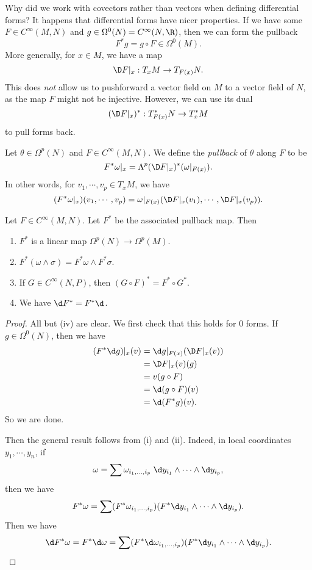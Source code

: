 \documentclass[a4paper]{article}
\begin{document}
Why did we work with covectors rather than vectors when defining differential forms? It happens that differential forms have nicer properties. If we have some $F \in C^\infty(M, N)$ and $g \in \Omega^0(N) = C^{\infty}(N, \R)$, then we can form the pullback
\[
  F^*g = g \circ F \in \Omega^0(M).
\]
More generally, for $x \in M$, we have a map
\[
  \D F|_x : T_x M \to T_{F(x)}N.
\]
This does \emph{not} allow us to pushforward a vector field on $M$ to a vector field of $N$, as the map $F$ might not be injective. However, we can use its dual
\[
  (\D F|_x)^*: T_{F(x)}^* N \to T_x^* M
\]
to pull forms back.
\begin{defi}
  Let $\theta \in \Omega^p(N)$ and $F \in C^\infty(M, N)$. We define the \emph{pullback} of $\theta$ along $F$ to be
  \[
    F^* \omega|_x = \Lambda^p(\D F|_x)^*(\omega|_{F(x)}).
  \]
  In other words, for $v_1, \cdots, v_p \in T_x M$, we have
  \[
    (F^*\omega|_x)(v_1, \cdots, v_p) = \omega|_{F(x)} (\D F|_x(v_1), \cdots, \D F|_x(v_p)).
  \]
\end{defi}

\begin{lemma}
  Let $F \in C^\infty(M, N)$. Let $F^*$ be the associated pullback map. Then
  \begin{enumerate}
    \item $F^*$ is a linear map $\Omega^p(N) \to \Omega^p(M)$.
    \item $F^*(\omega \wedge \sigma) = F^*\omega \wedge F^*\sigma$.
    \item If $G \in C^\infty (N, P)$, then $(G \circ F)^* = F^* \circ G^*$.
    \item We have $\d F^* = F^* \d$.
  \end{enumerate}
\end{lemma}

\begin{proof}
  All but (iv) are clear. We first check that this holds for $0$ forms. If $g \in \Omega^0(N)$, then we have
  \begin{align*}
    (F^* \d g)|_x(v) &= \d g|_{F(x)} (\D F|_x (v)) \\
    &= \D F|_x(v)(g) \\
    &= v(g \circ F) \\
    &= \d (g \circ F)(v) \\
    &= \d (F^* g)(v).
  \end{align*}
  So we are done.

  Then the general result follows from (i) and (ii). Indeed, in local coordinates $y_1, \cdots, y_n$, if
  \[
    \omega = \sum\omega_{i_1, \ldots, i_p}\; \d y_{i_1} \wedge \cdots \wedge \d y_{i_p},
  \]
  then we have
  \[
    F^* \omega = \sum (F^* \omega_{i_1, \ldots, i_p}) (F^* \d y_{i_1} \wedge \cdots \wedge \d y_{i_p}).
  \]
  Then we have
  \[
    \d F^* \omega = F^* \d \omega = \sum (F^* \d \omega_{i_1, \ldots, i_p}) (F^* \d y_{i_1} \wedge \cdots \wedge \d y_{i_p}). \qedhere
  \]
\end{proof}
\end{document}
